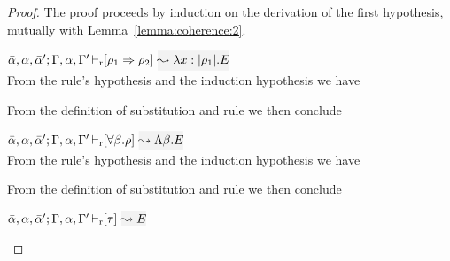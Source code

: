 \begin{proof}
The proof proceeds by induction on the derivation of the first hypothesis, mutually with Lemma~\ref{lemma:coherence:2}.
\begin{description}
\setlength{\itemsep}{1em}

\item[\fbox{\rref{R-IAbs}}]\quad$\drres{\bar{\alpha},\alpha,\bar{\alpha}'}{\tenv,\alpha,\tenv'}{\rulet_1 \To \rulet_2}{\abs{x}{|\rulet_1|}{E}}$ \\

From the rule's hypothesis and the induction hypothesis we have
\begin{myequation*}
\end{myequation*}
From the definition of substitution and rule  we then conclude
\begin{myequation*}
\end{myequation*}

\item[\fbox{\rref{R-TAbs}}]\quad$\drres{\bar{\alpha},\alpha,\bar{\alpha}'}{\tenv,\alpha,\tenv'}{\tall{\beta}{\rulet}}{\Abs{\beta}{E}}$\\

From the rule's hypothesis and the induction hypothesis we have
\begin{myequation*}
\end{myequation*}
From the definition of substitution and rule  we then conclude
\begin{myequation*}
\end{myequation*}
\item[\fbox{\rref{R-Simp}}]\quad$\drres{\bar{\alpha},\alpha,\bar{\alpha}'}{\tenv,\alpha,\tenv'}{\type}{E}$ \\


\end{description}
\end{proof}
